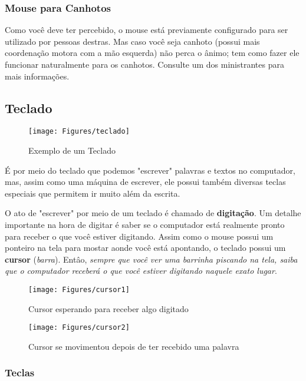 \documentclass[hidelinks,12pt]{article}
\begin{document}
\subsubsection{Mouse para Canhotos}

Como você deve ter percebido, o mouse está previamente configurado para ser utilizado por pessoas destras. Mas caso você seja canhoto (possui mais coordenação motora com a mão esquerda) não perca o ânimo; tem como fazer ele funcionar naturalmente para os canhotos. Consulte um dos ministrantes para mais informações.

\subsection{Teclado}

\begin{figure}[!h]
        \centering
		\texttt{[image: Figures/teclado]}
		\label{fig:teclado}
		\caption{Exemplo de um Teclado}
\end{figure}

É por meio do teclado que podemos "escrever" palavras e textos no computador, mas, assim como uma máquina de escrever, ele possui também diversas teclas especiais que permitem ir muito além da escrita. 

O ato de "escrever" por meio de um teclado é chamado de \textbf{digitação}. Um detalhe importante na hora de digitar é saber se o computador está realmente pronto para receber o que você estiver digitando. Assim como o mouse possui um ponteiro na tela para mostar aonde você está apontando, o teclado possui um \textbf{cursor} (\emph{barra}). Entâo, \emph{sempre que você ver uma barrinha piscando na tela, saiba que o computador receberá o que você estiver digitando naquele exato lugar}.

\begin{figure}[!h]
        \centering
		\texttt{[image: Figures/cursor1]}
		\label{fig:cursor1}
		\caption{Cursor esperando para receber algo digitado}
\end{figure}

\begin{figure}[!h]
        \centering
		\texttt{[image: Figures/cursor2]}
		\label{fig:cursor2}
		\caption{Cursor se movimentou depois de ter recebido uma palavra}
\end{figure}


\subsubsection{Teclas}
\end{document}
